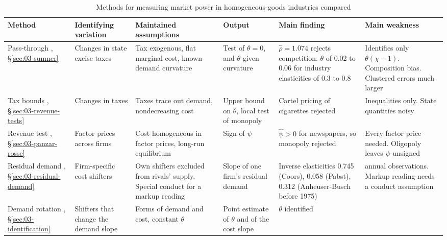 \begin{table}[!htb]
\centering
\begin{threeparttable}
\caption{Methods for measuring market power in homogeneous-goods industries compared}
\label{tab:03-synthesis}
\scriptsize
\setlength{\tabcolsep}{3pt}
\renewcommand{\arraystretch}{1.1}
\begin{tabularx}{\textwidth}{@{}>{\raggedright\arraybackslash}p{2.0cm}
  >{\raggedright\arraybackslash}X >{\raggedright\arraybackslash}X >{\raggedright\arraybackslash}p{1.9cm}
  >{\raggedright\arraybackslash}X >{\raggedright\arraybackslash}X@{}}
\toprule
Method & Identifying variation & Maintained assumptions & Output & Main finding & Main weakness \\
\midrule
Pass-through \citep{Sumner1981}, \S\ref{sec:03-sumner} & Changes in state excise taxes & Tax exogenous, flat marginal
  cost, known demand curvature & Test of $\theta = 0$, and $\theta$ given curvature & $\hat\rho = 1.074$ rejects
  competition. $\theta$ of 0.02 to 0.06 for industry elasticities of 0.3 to 0.8 & Identifies only $\theta(\chi - 1)$.
  Composition bias. Clustered errors much larger \\
\addlinespace
Tax bounds \citep{Sullivan1985,AshenfelterSullivan1987}, \S\ref{sec:03-revenue-tests} & Changes in taxes & Taxes trace
  out demand, nondecreasing cost & Upper bound on $\theta$, local test of monopoly & Cartel pricing of cigarettes
  rejected & Inequalities only. State quantities noisy \\
\addlinespace
Revenue test \citep{PanzarRosse1987}, \S\ref{sec:03-panzar-rosse} & Factor prices across firms & Cost homogeneous in
  factor prices, long-run equilibrium & Sign of $\psi$ & $\hat\psi > 0$ for newspapers, so monopoly rejected \citep{PanzarRosse1977} & Every
  factor price needed. Oligopoly leaves $\psi$ unsigned \\
\addlinespace
Residual demand \citep{BakerBresnahan1988}, \S\ref{sec:03-residual-demand} & Firm-specific cost shifters & Own shifters
  excluded from rivals' supply. Special conduct for a markup reading & Slope of one firm's residual demand & Inverse
  elasticities 0.745 (Coors), 0.058 (Pabst), 0.312 (Anheuser-Busch before 1975) & 21 annual observations. Markup
  reading needs a conduct assumption \\
\addlinespace
Demand rotation \citep{Bresnahan1982,Lau1982}, \S\ref{sec:03-identification} & Shifters that change the demand slope &
  Forms of demand and cost, constant $\theta$ & Point estimate of $\theta$ and of the cost slope & $\theta$ identified

\end{tabularx}
\end{threeparttable}
\end{table}
